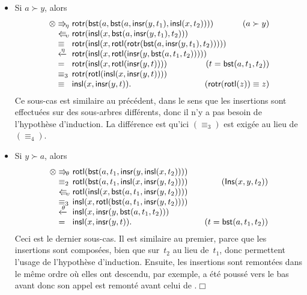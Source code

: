 \begin{itemize}
\begin{itemize}
    \item Si \(a \succ y\), alors
\begin{equation*}
\begin{array}{@{}r@{\;}l@{\;}l@{\hspace{-9mm}}r@{}}
  \otimes & \Rra{\eta} & \fun{rotr}(\fun{bst}(a,
  \fun{bst}(a,\fun{insr}(y,t_1),\fun{insl}(x,t_2))))
  & (a \succ y)\\
  & \Lla{\upsilon} &
  \fun{rotr}(\fun{insl}(x,\fun{bst}(a,\fun{insr}(y,t_1),t_2)))\\
  & \equiv & \fun{rotr}(\fun{insl}(x,
  \fun{rotl}(\fun{rotr}(\fun{bst}(a,\fun{insr}(y,t_1),t_2)))))\\
  & \xleftarrow{\smash{\eta}} &
  \fun{rotr}(\fun{insl}(x,\fun{rotl}(\fun{insr}(y,
  \fun{bst}(a,t_1,t_2)))))\\
  & = & \fun{rotr}(\fun{insl}(x,\fun{rotl}(\fun{insr}(y,t))))
  & (t=\fun{bst}(a,t_1,t_2))\\
  & \equiv_3 &
  \fun{rotr}(\fun{rotl}(\fun{insl}(x,\fun{insr}(y,t))))\\
  & \equiv & \fun{insl}(x,\fun{insr}(y,t)).
  & (\fun{rotr}(\fun{rotl}(z)) \equiv z)
\end{array}
\end{equation*}
Ce sous-cas est similaire au précédent, dans le sens que les
insertions sont effectuées sur des sous-arbres différents, donc il n'y
a pas besoin de l'hypothèse d'induction. La différence est qu'ici
\((\equiv_3)\) est exigée au lieu de \((\equiv_4)\).

  \item Si \(y \succ a\), alors
\begin{equation*}
\begin{array}{@{}r@{\;}l@{\;}l@{\qquad}r@{}}
  \otimes & \Rra{\theta} &
  \fun{rotl}(\fun{bst}(a,t_1,\fun{insr}(y,\fun{insl}(x,t_2))))\\
  & \equiv_2 & \fun{rotl}(\fun{bst}(a,t_1,\fun{insl}(x,
  \fun{insr}(y,t_2)))) & (\pred{Ins}{x,y,t_2})\\
  & \Lla{\upsilon} &
  \fun{rotl}(\fun{insl}(x,\fun{bst}(a,t_1,\fun{insr}(y,t_2))))\\
  & \equiv_3 & \fun{insl}(x,\fun{rotl}(\fun{bst}(a,t_1,
  \fun{insr}(y,t_2))))\\
  & \xleftarrow{\smash{\theta}} & \fun{insl}(x,\fun{insr}(y,
  \fun{bst}(a,t_1,t_2)))\\
  & = & \fun{insl}(x,\fun{insr}(y,t)). & (t=\fun{bst}(a,t_1,t_2))
\end{array}
\end{equation*}
Ceci est le dernier sous-cas. Il est similaire au premier, parce que
les insertions sont composées, bien que sur~\(t_2\) au lieu
de~\(t_1\), donc permettent l'usage de l'hypothèse
d'induction. Ensuite, les insertions sont remontées dans le même ordre
où elles ont descendu, par exemple,  a été poussé vers le
bas avant  donc son appel est remonté avant celui de
.\hfill\(\Box\)
  \end{itemize}

\end{itemize}

